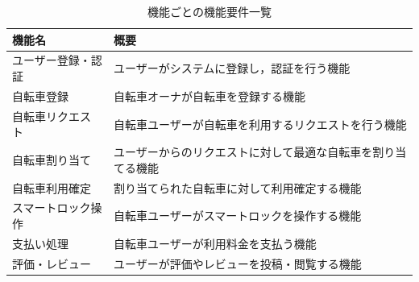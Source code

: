           
      \begin{table}[htbp]
        \caption{機能ごとの機能要件一覧}
        \label{tab:機能ごとの機能要件一覧}
        \centering
        \begin{tabular}{|l|p{4cm}|} \hline
          機能名 & 概要 \\ \hline
          ユーザー登録・認証 & ユーザーがシステムに登録し，認証を行う機能 \\ \hline
          自転車登録 & 自転車オーナが自転車を登録する機能 \\ \hline
          自転車リクエスト & 自転車ユーザーが自転車を利用するリクエストを行う機能 \\ \hline
          自転車割り当て & ユーザーからのリクエストに対して最適な自転車を割り当てる機能 \\ \hline
          自転車利用確定 & 割り当てられた自転車に対して利用確定する機能 \\ \hline
          スマートロック操作 & 自転車ユーザーがスマートロックを操作する機能 \\ \hline
          支払い処理 & 自転車ユーザーが利用料金を支払う機能 \\ \hline
          評価・レビュー & ユーザーが評価やレビューを投稿・閲覧する機能 \\ \hline
        \end{tabular}
      \end{table}


